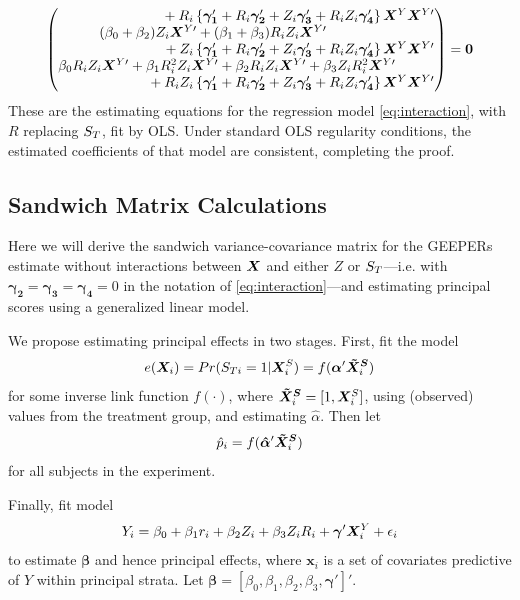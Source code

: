 \documentclass{statsoc} %
\begin{document}
\begin{equation*}
\begin{pmatrix}
    \hfill {}+\ri\left\{\bm{\gamma_1}'+R_i\bm{\gamma_2}'+Z_i\bm{\gamma_3}'+R_iZ_i\bm{\gamma_4}'\right\}\bxy\bxyt\\
        (\beta_0+\beta_2)Z_i\bxyt+(\beta_1+\beta_3)R_iZ_i\bxyt\phantom{-----}\\
    \hfill {}+Z_i\left\{\bm{\gamma_1}'+R_i\bm{\gamma_2}'+Z_i\bm{\gamma_3}'+R_iZ_i\bm{\gamma_4}'\right\}\bxy\bxyt\\
\beta_0\ri Z_i\bxyt+\beta_1R_i^2Z_i\bxyt+\beta_2\ri Z_i\bxyt+\beta_3Z_iR_i^2\bxyt\phantom{---}\\
    \hfill {}+\ri Z_i\left\{\bm{\gamma_1}'+R_i\bm{\gamma_2}'+Z_i\bm{\gamma_3}'+R_iZ_i\bm{\gamma_4}'\right\}\bxy\bxyt\\
  \end{pmatrix}=\bm{0}
\end{equation*}
These are the estimating equations for the regression model \eqref{eq:interaction}, with $R$ replacing $S_T$, fit by OLS. 
Under standard OLS regularity conditions, the estimated coefficients of that model are consistent, completing the proof.  

\subsection{Sandwich Matrix Calculations}

Here we will derive the sandwich variance-covariance matrix for the GEEPERs estimate without interactions between $\bm{X}$ and either $Z$ or $S_T$---i.e. with $\bm{\gamma_2}=\bm{\gamma_3}=\bm{\gamma_4}=0$ in the notation of \eqref{eq:interaction}---and estimating principal scores using a generalized linear model. 

We propose estimating principal effects in two stages.
First, fit the model
\begin{equation}\label{eq:psMod}
  e(\bm{X}_i)=Pr(S_{Ti}=1|\bm{X}^S_i)=f(\bm{\alpha}'\bm{\tilde{X}^S}_i)
\end{equation}
for some inverse link function $f(\cdot)$, where $\bm{\tilde{X}^S}_i=[1,\bm{X}^S_i]$, using (observed) values from the treatment group, and estimating $\hat{\alpha}$.
Then let
\begin{equation}\label{eq:ps}
  \hat{p}_i=f(\bm{\hat{\alpha}}'\bm{\tilde{X}^S}_i)
\end{equation}
for all subjects in the experiment.

Finally, fit model
\begin{equation}\label{eq:regression}
  Y_i=\beta_0+\beta_1r_i+\beta_2Z_i+\beta_3Z_iR_i+\bm{\gamma}'\bm{X}^Y_i+\epsilon_i
\end{equation}
to estimate $\bm{\beta}$ and hence principal effects, where $\bm{x}_i$ is a set of covariates predictive of $Y$ within principal strata.
Let $\bm{\beta}=[\beta_0,\beta_1,\beta_2,\beta_3,\bm{\gamma}']'$.
\end{document}
